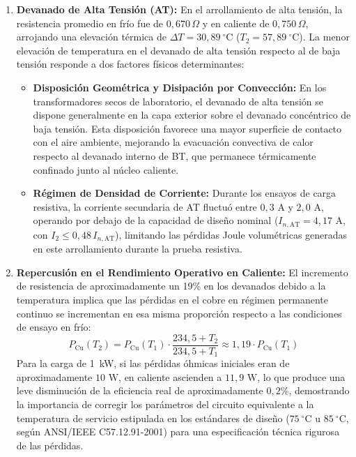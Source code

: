 \begin{enumerate}
    \item \textbf{Devanado de Alta Tensión (AT):}
    En el arrollamiento de alta tensión, la resistencia promedio en frío fue de $0{,}670\,\Omega$ y en caliente de $0{,}750\,\Omega$, arrojando una elevación térmica de $\Delta T = 30{,}89~^{\circ}\mathrm{C}$ ($T_2 = 57{,}89~^{\circ}\mathrm{C}$). La menor elevación de temperatura en el devanado de alta tensión respecto al de baja tensión responde a dos factores físicos determinantes:
    \begin{itemize}
        \item \textbf{Disposición Geométrica y Disipación por Convección:} En los transformadores secos de laboratorio, el devanado de alta tensión se dispone generalmente en la capa exterior sobre el devanado concéntrico de baja tensión. Esta disposición favorece una mayor superficie de contacto con el aire ambiente, mejorando la evacuación convectiva de calor respecto al devanado interno de BT, que permanece térmicamente confinado junto al núcleo caliente.
        \item \textbf{Régimen de Densidad de Corriente:} Durante los ensayos de carga resistiva, la corriente secundaria de AT fluctuó entre $0{,}3\text{ A}$ y $2{,}0\text{ A}$, operando por debajo de la capacidad de diseño nominal ($I_{n,\text{AT}} = 4{,}17\text{ A}$, con $I_2 \le 0{,}48\,I_{n,\text{AT}}$), limitando las pérdidas Joule volumétricas generadas en este arrollamiento durante la prueba resistiva.
    \end{itemize}

    \item \textbf{Repercusión en el Rendimiento Operativo en Caliente:}
    El incremento de resistencia de aproximadamente un 19\% en los devanados debido a la temperatura implica que las pérdidas en el cobre en régimen permanente continuo se incrementan en esa misma proporción respecto a las condiciones de ensayo en frío:
    \begin{equation}
        P_{\text{Cu}}(T_2) = P_{\text{Cu}}(T_1) \cdot \frac{234{,}5 + T_2}{234{,}5 + T_1} \approx 1{,}19 \cdot P_{\text{Cu}}(T_1)
    \end{equation}
    Para la carga de 1~kW, si las pérdidas óhmicas iniciales eran de aproximadamente $10\text{ W}$, en caliente ascienden a $11{,}9\text{ W}$, lo que produce una leve disminución de la eficiencia real de aproximadamente $0{,}2\%$, demostrando la importancia de corregir los parámetros del circuito equivalente a la temperatura de servicio estipulada en los estándares de diseño ($75~^{\circ}\mathrm{C}$ u $85~^{\circ}\mathrm{C}$, según ANSI/IEEE C57.12.91-2001) para una especificación técnica rigurosa de las pérdidas.
\end{enumerate}
